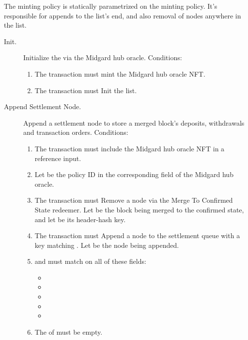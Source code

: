 \documentclass[../midgard.tex]{subfiles}
\begin{document}
The  minting policy is statically parametrized on the  minting policy.
It's responsible for appends to the  list's end, and also removal of nodes anywhere in the list.
\begin{description}
  \item[Init.] Initialize the  via the Midgard hub oracle.
    Conditions:
      \begin{enumerate}
        \item The transaction must mint the Midgard hub oracle NFT.
        \item The transaction must Init the  list.
      \end{enumerate}
  \item[Append Settlement Node.] Append a settlement node to store a merged block's deposits, withdrawals and transaction orders.
    Conditions:
      \begin{enumerate}
        \item The transaction must include the Midgard hub oracle NFT in a reference input.
        \item Let  be the policy ID in the corresponding field of the Midgard hub oracle.
        \item The transaction must Remove a  node via the Merge To Confirmed State redeemer.
          Let  be the block being merged to the confirmed state, and let  be its header-hash key.
        \item The transaction must Append a node to the settlement queue with a key matching .
          Let  be the node being appended.
        \item {} and  must match on all of these fields:
          \begin{itemize}
            \item {}
            \item {}
            \item {}
            \item {}
            \item {}
          \end{itemize}
        \item The  of  must be empty.

\end{enumerate}
\end{description}
\end{document}
